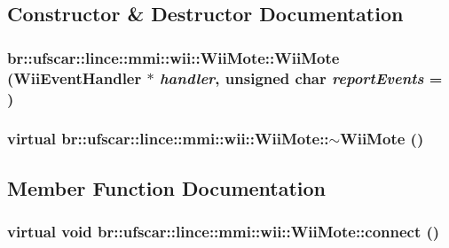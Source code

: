 \subsection{Constructor \& Destructor Documentation}
\hypertarget{classbr_1_1ufscar_1_1lince_1_1mmi_1_1wii_1_1WiiMote_a286176220d743bd02ee02b35970916a3}{
\subsubsection[{WiiMote}]{\setlength{\rightskip}{0pt plus 5cm}br::ufscar::lince::mmi::wii::WiiMote::WiiMote ({\bf WiiEventHandler} $\ast$ {\em handler}, \/  unsigned char {\em reportEvents} = {})}}
\label{classbr_1_1ufscar_1_1lince_1_1mmi_1_1wii_1_1WiiMote_a286176220d743bd02ee02b35970916a3}
\hypertarget{classbr_1_1ufscar_1_1lince_1_1mmi_1_1wii_1_1WiiMote_aa0a674eed3f5c4cebf761682dbcdf6e8}{
\subsubsection[{$\sim$WiiMote}]{\setlength{\rightskip}{0pt plus 5cm}virtual br::ufscar::lince::mmi::wii::WiiMote::$\sim$WiiMote ()}}
\label{classbr_1_1ufscar_1_1lince_1_1mmi_1_1wii_1_1WiiMote_aa0a674eed3f5c4cebf761682dbcdf6e8}


\subsection{Member Function Documentation}
\hypertarget{classbr_1_1ufscar_1_1lince_1_1mmi_1_1wii_1_1WiiMote_a15e0d1b2ac9fde887e870aeb597c0dc8}{
\subsubsection[{connect}]{\setlength{\rightskip}{0pt plus 5cm}virtual void br::ufscar::lince::mmi::wii::WiiMote::connect ()}}
\label{classbr_1_1ufscar_1_1lince_1_1mmi_1_1wii_1_1WiiMote_a15e0d1b2ac9fde887e870aeb597c0dc8}


